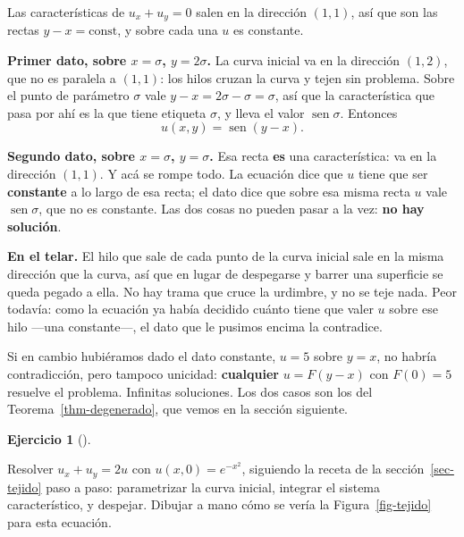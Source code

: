 \documentclass[
  spanish,
  a4paper,
]{scrbook}
\theoremstyle{definition}
\theoremstyle{plain}
\theoremstyle{definition}
\theoremstyle{plain}
\theoremstyle{definition}
\newtheorem{exercise}{Ejercicio}[chapter]
\theoremstyle{remark}
\begin{document}
\begin{tcolorbox}[enhanced jigsaw, arc=.35mm, bottomrule=.15mm, bottomtitle=1mm, breakable, colback=white, colbacktitle=quarto-callout-tip-color!10!white, colframe=quarto-callout-tip-color-frame, coltitle=black, left=2mm, leftrule=.75mm, opacityback=0, opacitybacktitle=0.6, rightrule=.15mm, title=\textcolor{quarto-callout-tip-color}{\faLightbulb}\hspace{0.5em}{Solución}, titlerule=0mm, toprule=.15mm, toptitle=1mm]

Las características de \(u_x + u_y = 0\) salen en la dirección
\((1,1)\), así que son las rectas \(y - x = \text{const}\), y sobre cada
una \(u\) es constante.

\textbf{Primer dato, sobre \(x=\sigma\), \(y=2\sigma\).} La curva
inicial va en la dirección \((1,2)\), que no es paralela a \((1,1)\):
los hilos cruzan la curva y tejen sin problema. Sobre el punto de
parámetro \(\sigma\) vale \(y - x = 2\sigma - \sigma = \sigma\), así que
la característica que pasa por ahí es la que tiene etiqueta \(\sigma\),
y lleva el valor \(\operatorname{sen}\sigma\). Entonces
\[u(x,y) = \operatorname{sen}(y-x).\]

\textbf{Segundo dato, sobre \(x=\sigma\), \(y=\sigma\).} Esa recta
\textbf{es} una característica: va en la dirección \((1,1)\). Y acá se
rompe todo. La ecuación dice que \(u\) tiene que ser \textbf{constante}
a lo largo de esa recta; el dato dice que sobre esa misma recta \(u\)
vale \(\operatorname{sen}\sigma\), que no es constante. Las dos cosas no
pueden pasar a la vez: \textbf{no hay solución}.

\textbf{En el telar.} El hilo que sale de cada punto de la curva inicial
sale en la misma dirección que la curva, así que en lugar de despegarse
y barrer una superficie se queda pegado a ella. No hay trama que cruce
la urdimbre, y no se teje nada. Peor todavía: como la ecuación ya había
decidido cuánto tiene que valer \(u\) sobre ese hilo ---una
constante---, el dato que le pusimos encima la contradice.

Si en cambio hubiéramos dado el dato constante, \(u = 5\) sobre \(y=x\),
no habría contradicción, pero tampoco unicidad: \textbf{cualquier}
\(u = F(y-x)\) con \(F(0)=5\) resuelve el problema. Infinitas
soluciones. Los dos casos son los del Teorema~\ref{thm-degenerado}, que
vemos en la sección siguiente.

\end{tcolorbox}

\begin{exercise}[]\protect\hypertarget{exr-hilo-sube}{}\label{exr-hilo-sube}

Resolver \(u_x + u_y = 2u\) con \(u(x,0) = e^{-x^2}\), siguiendo la
receta de la sección~\ref{sec-tejido} paso a paso: parametrizar la curva
inicial, integrar el sistema característico, y despejar. Dibujar a mano
cómo se vería la Figura~\ref{fig-tejido} para esta ecuación.

\end{exercise}
\end{document}
